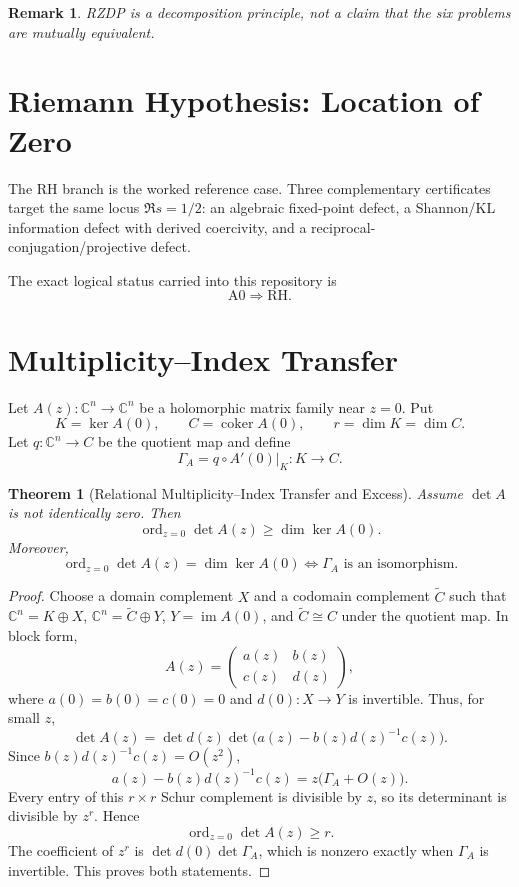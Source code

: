 \documentclass[11pt]{article}
\newtheorem{theorem}{Theorem}
\newtheorem{remark}{Remark}
\begin{document}
\begin{remark}
RZDP is a decomposition principle, not a claim that the six problems are mutually equivalent.
\end{remark}

\section{Riemann Hypothesis: Location of Zero}

The RH branch is the worked reference case. Three complementary certificates target the same locus \(\Re s=1/2\): an algebraic fixed-point defect, a Shannon/KL information defect with derived coercivity, and a reciprocal-conjugation/projective defect.

The exact logical status carried into this repository is
\[
\boxed{\mathrm{A0}\Longrightarrow \mathrm{RH}}.
\]

\section{Multiplicity--Index Transfer}

Let \(A(z):\mathbb C^n\to\mathbb C^n\) be a holomorphic matrix family near \(z=0\). Put
\[
K=\ker A(0),\qquad C=\operatorname{coker}A(0),\qquad r=\dim K=\dim C.
\]
Let \(q:\mathbb C^n\to C\) be the quotient map and define
\[
\Gamma_A=q\circ A'(0)|_K:K\to C.
\]

\begin{theorem}[Relational Multiplicity--Index Transfer and Excess]
Assume \(\det A\) is not identically zero. Then
\[
\boxed{
\operatorname{ord}_{z=0}\det A(z)\ge \dim\ker A(0).
}
\]
Moreover,
\[
\boxed{
\operatorname{ord}_{z=0}\det A(z)=\dim\ker A(0)
\iff
\Gamma_A\text{ is an isomorphism}.
}
\]
\end{theorem}

\begin{proof}
Choose a domain complement \(X\) and a codomain complement \(\widetilde C\) such that \(\mathbb C^n=K\oplus X\), \(\mathbb C^n=\widetilde C\oplus Y\), \(Y=\operatorname{im}A(0)\), and \(\widetilde C\cong C\) under the quotient map. In block form,
\[
A(z)=\begin{pmatrix}a(z)&b(z)\\c(z)&d(z)\end{pmatrix},
\]
where \(a(0)=b(0)=c(0)=0\) and \(d(0):X\to Y\) is invertible. Thus, for small \(z\),
\[
\det A(z)=\det d(z)\det\!\bigl(a(z)-b(z)d(z)^{-1}c(z)\bigr).
\]
Since \(b(z)d(z)^{-1}c(z)=O(z^2)\),
\[
a(z)-b(z)d(z)^{-1}c(z)
=
z\bigl(\Gamma_A+O(z)\bigr).
\]
Every entry of this \(r\times r\) Schur complement is divisible by \(z\), so its determinant is divisible by \(z^r\). Hence
\[
\operatorname{ord}_{z=0}\det A(z)\ge r.
\]
The coefficient of \(z^r\) is \(\det d(0)\det\Gamma_A\), which is nonzero exactly when \(\Gamma_A\) is invertible. This proves both statements.
\end{proof}
\end{document}
